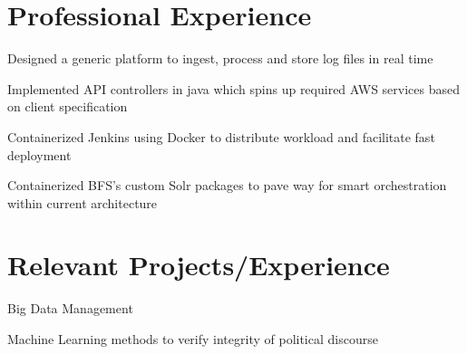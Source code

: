 \documentclass[]{resume_openfont}
\begin{document}
\hfill
\begin{minipage}[t]{0.66\textwidth} 


\section{Professional Experience}

\vspace{\topsep} %
\begin{tightemize}
\item Designed a generic platform to ingest, process and store log files in real time
\item Implemented API controllers in java which spins up required AWS services based on client specification
\end{tightemize}
\sectionsep

\begin{tightemize}
\item Containerized Jenkins using Docker to distribute workload and facilitate fast deployment
\item Containerized BFS’s custom Solr packages to pave way for smart orchestration within current architecture
\end{tightemize}
\sectionsep


\section{Relevant Projects/Experience}

\begin{tightemize}
\item Big Data Management
\item Machine Learning methods to verify integrity of political discourse
\end{tightemize}
\sectionsep


\end{minipage}
\end{document}
